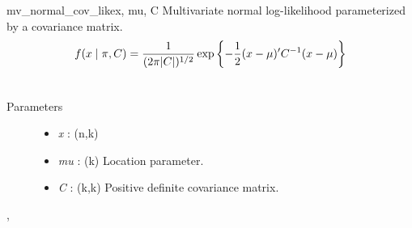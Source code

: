 \hypertarget{pymc.distributions.mv_normal_cov_like}{}\begin{funcdesc}{mv\_normal\_cov\_like}{x, mu, C}
Multivariate normal log-likelihood parameterized by a covariance
matrix.
\begin{gather}
\begin{split}f(x \mid \pi, C) = \frac{1}{(2\pi|C|)^{1/2}} \exp\left\{ -\frac{1}{2} (x-\mu)^{\prime}C^{-1}(x-\mu) \right\}\end{split}\notag\\\begin{split}\end{split}\notag
\end{gather}\begin{description}
\item[Parameters] \leavevmode\begin{itemize}
\item {}
\emph{x} : (n,k)

\item {}
\emph{mu} : (k) Location parameter.

\item {}
\emph{C} : (k,k) Positive definite covariance matrix.

\end{itemize}

\end{description}




\hyperlink{pymc.distributions.mv_normal_like}{}, \hyperlink{pymc.distributions.mv_normal_chol_like}{}


\end{funcdesc}

